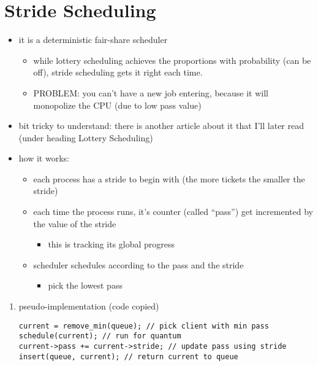 \documentclass[11pt]{report}
\begin{document}
\section{Stride Scheduling}
\label{sec:org3130976}
\begin{itemize}
\item it is a deterministic fair-share scheduler
\begin{itemize}
\item while lottery scheduling achieves the proportions with probability (can be off), stride scheduling gets it right each time.
\item PROBLEM: you can't have a new job entering, because it will monopolize the CPU (due to low pass value)
\end{itemize}
\item bit tricky to understand: there is another article about it that I'll later read (under heading Lottery Scheduling)
\item how it works:
\begin{itemize}
\item each process has a stride to begin with (the more tickets the smaller the stride)
\item each time the process runs, it's counter (called ``pass'') get incremented by the value of the stride
\begin{itemize}
\item this is tracking its global progress
\end{itemize}
\item scheduler schedules according to the pass and the stride
\begin{itemize}
\item pick the lowest pass
\end{itemize}
\end{itemize}
\end{itemize}
\begin{enumerate}
\item pseudo-implementation (code copied)
\label{sec:org4c549fe}
\begin{verbatim}
current = remove_min(queue); // pick client with min pass
schedule(current); // run for quantum
current->pass += current->stride; // update pass using stride
insert(queue, current); // return current to queue
\end{verbatim}
\end{enumerate}
\end{document}
